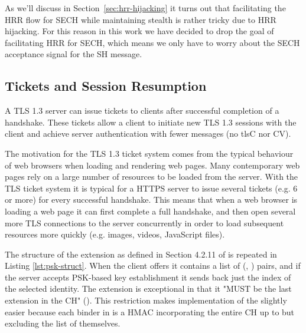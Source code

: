 As we'll discuss in Section~\ref{sec:hrr-hijacking}
it turns out that facilitating the \ac{HRR} flow
for \ac{SECH} while maintaining stealth
is rather tricky due to \ac{HRR} hijacking.
For this reason in this work we have decided to drop the
goal of facilitating \ac{HRR} for \ac{SECH},
which means we only have to worry about
the \ac{SECH} acceptance signal
for the \ac{SH} message.

\subsection{Tickets and Session Resumption}

A TLS 1.3 server can issue tickets to clients after successful completion of a handshake.
These tickets allow a client to initiate new \ac{TLS} 1.3
sessions with the client and achieve server authentication
with fewer messages (no \ac{tlsC} nor \ac{CV}).

The motivation for the \ac{TLS} 1.3 ticket system
comes from the typical behaviour of web browsers when loading and rendering web pages.
Many contemporary web pages rely on a large number of resources to be loaded from the server.
With the \ac{TLS} ticket system it is typical for a \ac{HTTPS} server
to issue several tickets (e.g. 6 or more) for every successful handshake.
This means that when a web browser is loading a web page it can first complete a full handshake,
and then open several more TLS connections to the server concurrently
in order to load subsequent resources more quickly (e.g. images, videos, JavaScript files).


The structure of the  extension as defined in Section 4.2.11 of \cite{esni} is repeated in Listing \ref{lst:psk-struct}.
When the client offers  it contains a list of (, ) pairs,
and if the server accepts \ac{PSK}-based key establishment it sends back just the index of the selected identity.
The  extension is exceptional in that it
"MUST be the last extension in the \ac{CH}" (\citet[Section 4.2]{esni}).
This restriction makes implementation of the  slightly easier because each binder in  is a \ac{HMAC} incorporating the entire \ac{CH} up to but excluding the list of  themselves.

